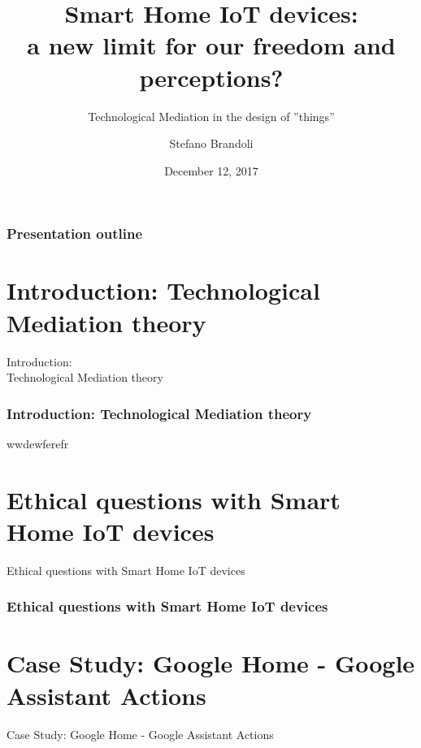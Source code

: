 \documentclass{beamer}
\title{Smart Home IoT devices: \\a new limit for our freedom and perceptions?}
\subtitle{\vspace*{1cm}Technological Mediation in the design of ''things''}
\author[Stefano Brandoli]{Stefano Brandoli}
\institute[PoliMi]{Politecnico di Milano}
\date{December 12, 2017}
\begin{document}
\begin{frame}
\maketitle
\end{frame}

\begin{frame}
\frametitle{Presentation outline}
\tableofcontents
\end{frame}

\section{Introduction: Technological Mediation theory}

\begin{frame}
\begin{center} 
	 Introduction:\\Technological Mediation theory
\end{center}
\end{frame}

\begin{frame}
\frametitle{Introduction: Technological Mediation theory}
wwdewferefr
\end{frame}


\section{Ethical questions with Smart Home IoT devices}

\begin{frame}
\begin{center} 
	 Ethical questions with Smart Home IoT devices
\end{center}
\end{frame}

\begin{frame}
\frametitle{Ethical questions with Smart Home IoT devices}
\end{frame}


\section{Case Study: Google Home - Google Assistant Actions}

\begin{frame}
\begin{center} 
	 Case Study: Google Home - Google Assistant Actions
\end{center}
\end{frame}
\end{document}
